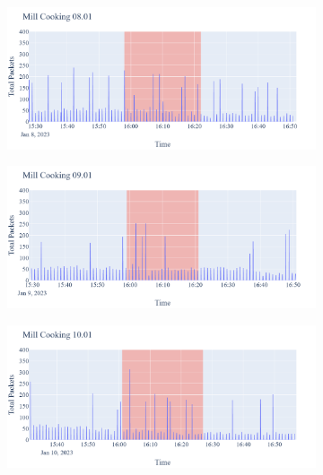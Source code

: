 \begin{figure}[H]
    \begin{subfigure}[b]{0.47\textwidth}
        \centering
        \includegraphics[width=1.2\hsize]{figures/Mill_Cooking_Packets_08.01.png}
    \end{subfigure}
    \begin{subfigure}[b]{0.47\textwidth}
        \centering
        \includegraphics[width=1.2\hsize]{figures/Mill_Cooking_Packets_09.01.png}
    \end{subfigure}
    \begin{subfigure}[b]{0.47\textwidth}
        \centering
        \includegraphics[width=1.2\hsize]{figures/Mill_Cooking_Packets_10.01.png}
    \end{subfigure}
    \begin{subfigure}[b]{0.47\textwidth}

\end{subfigure}
\end{figure}
